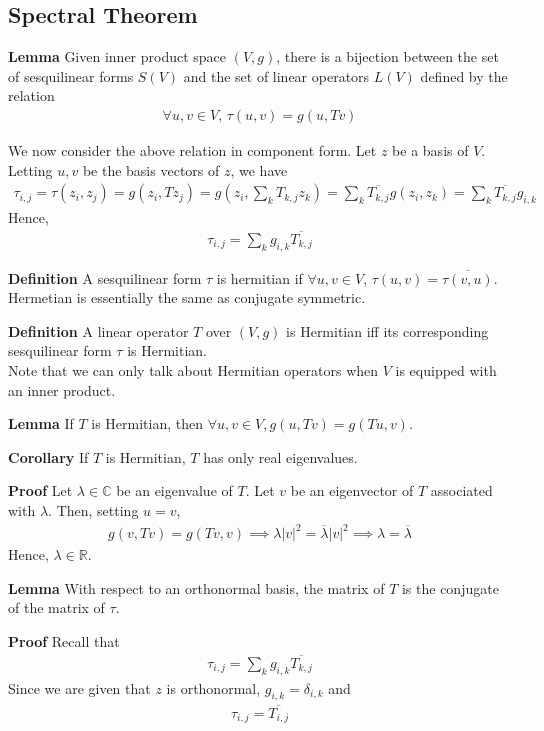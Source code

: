 \documentclass{article}
\begin{document}
\subsection{Spectral Theorem}
\textbf{Lemma} Given inner product space $(V,g)$, there is a bijection between the set of sesquilinear forms $S(V)$ and the set of linear operators $L(V)$ defined by the relation
\begin{align*}
	\forall u,v \in V,\, \tau(u,v) = g(u,Tv) 
\end{align*}

We now consider the above relation in component form. Let $z$ be a basis of $V$. Letting $u,v$ be the basis vectors of $z$, we have
\begin{align*}
	\tau_{i,j} = \tau(z_i,z_j) = g(z_i,Tz_j) = g(z_i,\sum_k T_{k,j}z_k) = \sum_k \overline{T_{k,j}}g(z_i, z_k)=\sum_k \overline{T_{k,j}}g_{i,k}
\end{align*}
Hence, 
\begin{align*}
	\tau_{i,j} = \sum_k g_{i,k}\overline{T_{k,j}}
\end{align*}


\textbf{Definition} A sesquilinear form $\tau$ is hermitian if $\forall u,v\in V,\, \tau(u,v)=\overline{\tau(v,u)}$.\\
Hermetian is essentially the same as conjugate symmetric.

\textbf{Definition} A linear operator $T$ over $(V,g)$ is Hermitian iff its corresponding sesquilinear form $\tau$ is Hermitian.\\
Note that we can only talk about Hermitian operators when $V$ is equipped with an inner product.


\textbf{Lemma} If $T$ is Hermitian, then $\forall u,v \in V, g(u,Tv)=g(Tu,v)$.

\textbf{Corollary} If $T$ is Hermitian, $T$ has only real eigenvalues.

\textbf{Proof} Let $\lambda \in \mathbb{C}$ be an eigenvalue of $T$. Let $v$ be an eigenvector of $T$ associated with $\lambda$. Then, setting $u=v$,
\begin{align*}
	g(v,Tv) = g(Tv,v) \implies \lambda |v|^2=\overline{\lambda} |v|^2 \implies \lambda=\overline{\lambda}
\end{align*}
Hence, $\lambda \in \mathbb{R}$.

\textbf{Lemma} With respect to an orthonormal basis, the matrix of $T$ is the conjugate of the matrix of $\tau$.

\textbf{Proof} Recall that 
\begin{align*}
	\tau_{i,j} = \sum_k g_{i,k}\overline{T_{k,j}}
\end{align*}
Since we are given that $z$ is orthonormal, $g_{i,k}=\delta_{i,k}$ and 
\begin{align*}
	\tau_{i,j} = \overline{T_{i,j}}
\end{align*}
\end{document}
